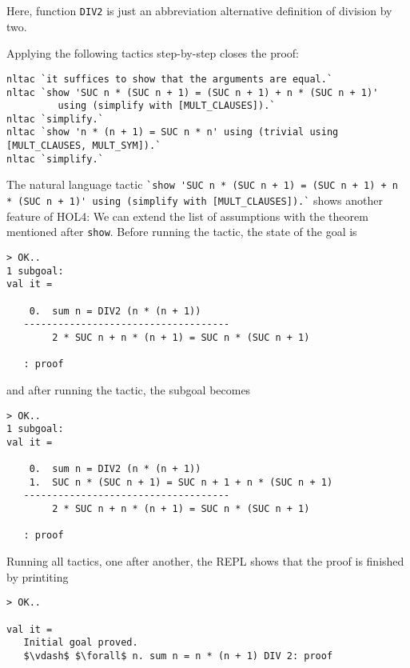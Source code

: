 Here, function \lstinline{DIV2} is just an abbreviation alternative definition
of division by two.

Applying the following tactics step-by-step closes the proof:

\begin{lstlisting}
nltac `it suffices to show that the arguments are equal.`
nltac `show 'SUC n * (SUC n + 1) = (SUC n + 1) + n * (SUC n + 1)'
         using (simplify with [MULT_CLAUSES]).`
nltac `simplify.`
nltac `show 'n * (n + 1) = SUC n * n' using (trivial using [MULT_CLAUSES, MULT_SYM]).`
nltac `simplify.`
\end{lstlisting}

\begin{sloppypar}
The natural language tactic \lstinline{`show 'SUC n * (SUC n + 1) = (SUC n + 1) + n * (SUC n + 1)' using (simplify with [MULT_CLAUSES]).`}
shows another feature of HOL4:
We can extend the list of assumptions with the theorem mentioned after
\lstinline{show}.
Before running the tactic, the state of the goal is
\end{sloppypar}
\begin{lstlisting}
> OK..
1 subgoal:
val it =

    0.  sum n = DIV2 (n * (n + 1))
   ------------------------------------
        2 * SUC n + n * (n + 1) = SUC n * (SUC n + 1)

   : proof
\end{lstlisting}

and after running the tactic, the subgoal becomes
\begin{lstlisting}
> OK..
1 subgoal:
val it =

    0.  sum n = DIV2 (n * (n + 1))
    1.  SUC n * (SUC n + 1) = SUC n + 1 + n * (SUC n + 1)
   ------------------------------------
        2 * SUC n + n * (n + 1) = SUC n * (SUC n + 1)

   : proof
\end{lstlisting}

Running all tactics, one after another, the REPL shows that the proof is finished by printiting
\begin{lstlisting}
> OK..

val it =
   Initial goal proved.
   $\vdash$ $\forall$ n. sum n = n * (n + 1) DIV 2: proof
\end{lstlisting}

